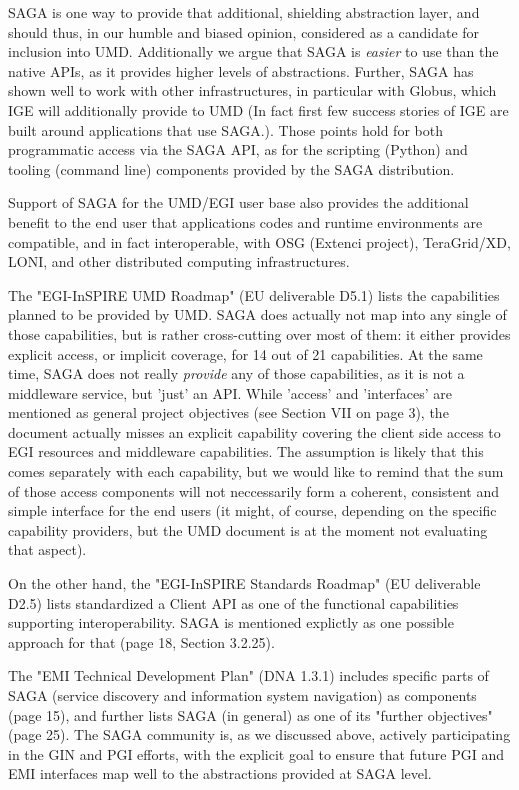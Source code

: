 \documentclass[12pt]{article}
\newcommand{\I}[1]{\textit{#1}}
\begin{document}
SAGA is one way to provide that additional, shielding abstraction
layer, and should thus, in our humble and biased opinion, considered
as a candidate for inclusion into UMD.  Additionally we argue that
SAGA is \I{easier} to use than the native APIs, as it provides higher
levels of abstractions.  Further, SAGA has shown well to work with
other infrastructures, in particular with Globus, which IGE will
additionally provide to UMD (In fact first few success stories of IGE
are built around applications that use SAGA.).  Those points hold for
both programmatic access via the SAGA API, as for the scripting
(Python) and tooling (command line) components provided by the SAGA
distribution.

Support of SAGA for the UMD/EGI user base also provides the additional
benefit to the end user that applications codes and runtime
environments are compatible, and in fact interoperable, with OSG
(Extenci project), TeraGrid/XD, LONI, and other distributed computing
infrastructures.

The "EGI-InSPIRE UMD Roadmap" (EU deliverable D5.1) lists the
capabilities planned to be provided by UMD.  SAGA does actually not
map into any single of those capabilities, but is rather cross-cutting
over most of them: it either provides explicit access, or implicit
coverage, for 14 out of 21 capabilities.  At the same time, SAGA does
not really \I{provide} any of those capabilities, as it is not a
middleware service, but 'just' an API.  While 'access' and
'interfaces' are mentioned as general project objectives (see Section
VII on page 3), the document actually misses an explicit capability
covering the client side access to EGI resources and middleware
capabilities.  The assumption is likely that this comes separately
with each capability, but we would like to remind that the sum of
those access components will not neccessarily form a coherent,
consistent and simple interface for the end users (it might, of
course, depending on the specific capability providers, but the UMD
document is at the moment not evaluating that aspect).

On the other hand, the "EGI-InSPIRE Standards Roadmap" (EU deliverable
D2.5) lists standardized a Client API as one of the functional
capabilities supporting interoperability.  SAGA is mentioned
explictly as one possible approach for that (page 18, Section
3.2.25).

The "EMI Technical Development Plan" (DNA 1.3.1) includes specific
parts of SAGA (service discovery and information system navigation) as
components (page 15), and further lists SAGA (in general) as one of
its "further objectives" (page 25).  The SAGA community is, as we
discussed above, actively participating in the GIN and PGI efforts,
with the explicit goal to ensure that future PGI and EMI interfaces
map well to the abstractions provided at SAGA level.
\end{document}
